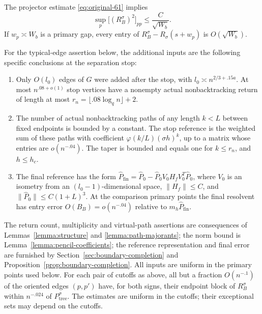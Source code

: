 \begin{lemma}
\label{lem:repair-bulk}
The projector estimate \eqref{eq:original-61} implies
\begin{equation}
 \sup_p\bigl[(R_B^\sigma)^2\bigr]_{pp}
 \le \frac{C}{\sqrt{W_b}}.
 \label{eq:original-63}
\end{equation}
If $w_p\asymp W_b$ is a primary gap, every entry of
$R_B^\sigma-R_\sigma(s+w_p)$ is $O(\sqrt{W_b})$.

For the typical-edge assertion below, the additional inputs are the following
specific conclusions at the separation stop:
\begin{enumerate}
\item Only $O(l_0)$ edges of $G$ were added after the stop, with
$l_0\asymp n^{2/3+.15a}$.  At most $n^{.08+o(1)}$ stop vertices have a
nonempty actual nonbacktracking return of length at most
$r_n=\lfloor .08\log_q n\rfloor+2$.
\item The number of actual nonbacktracking paths of any length $k<L$ between
fixed endpoints is bounded by a constant.  The stop reference is the weighted
sum of these paths with coefficient $\varphi(k/L)(\sigma h)^k$, up to a
matrix whose entries are $o(n^{-.04})$.  The taper is bounded and equals one
for $k\le r_n$, and $h\le h_c$.
\item The final reference has the form
$\widehat P_{\mathrm{fin}}=\widehat P_0-
 \widehat P_0V_0H_fV_0^T\widehat P_0$, where $V_0$ is an isometry from an
$(l_0-1)$-dimensional space, $\|H_f\|\le C$, and
$\|\widehat P_0\|\le C(1+L)^3$.
At the comparison primary points the final resolvent has entry error
$O(B_B)=o(n^{-.04})$ relative to $m_h\widehat P_{\mathrm{fin}}$.
\end{enumerate}
The return count, multiplicity and virtual-path assertions are consequences of
Lemmas~\ref{lemma:structure} and \ref{lemma:path-majorants}; the norm bound is
Lemma~\ref{lemma:pencil-coefficients}; the reference representation and final
error are furnished by Section~\ref{sec:boundary-completion} and
Proposition~\ref{prop:boundary-completion}.  All inputs are uniform in the
primary points used below.
For each pair of cutoffs as above, all but a fraction $O(n^{-.1})$ of the oriented edges
$(p,p')$ have, for both signs, their endpoint block of $R_B^\sigma$ within
$n^{-.024}$ of $P_{\mathrm{tree}}^\sigma$.  The estimates are uniform in the
cutoffs; their exceptional sets may depend on the cutoffs.
\end{lemma}

